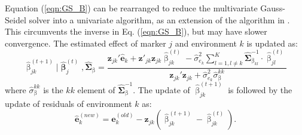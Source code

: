 \documentclass{bmcart}
\begin{document}
Equation (\ref{eqn:GS_B}) can be rearranged to reduce the multivariate Gauss-Seidel solver into a univariate algorithm, as an extension of the algorithm in \cite{GSRU}. This circumvents the inverse in Eq. (\ref{eqn:GS_B}), but may have slower convergence. The estimated effect of marker $j$ and environment $k$ is updated as:
\begin{equation} \nonumber
\hat{\upbeta}^{(t+1)}_{jk}|\hat{\mathbf{\upbeta}}^{(t)}_j,\hat{\mathbf{\Sigma}}_\upbeta = \frac{ \mathbf{z}_{jk}'\hat{\mathbf{e}}_k + \mathbf{z}'_{jk}  \mathbf{z}_{jk} \hat{\upbeta}_{jk}^{(t)} - \hat{\sigma}^{2}_{e_k}\sum^K_{l=1, l\ne k}\hat{\mathbf{\Sigma}}^{-1}_{\upbeta_{kl}}\cdot\hat{\upbeta}^{(t)}_{jl}}{ \mathbf{z}_{jk} ' \mathbf{z}_{jk} + \hat{\sigma}^2_{e_k}\hat{\sigma}_\upbeta^{kk} }
\end{equation}
where $\hat{\sigma}_\upbeta^{kk}$ is the $kk$ element of $\hat{\mathbf{\Sigma}}^{-1}_\upbeta$.
The update of $\hat{\upbeta}^{(t+1)}_{jk}$ is followed by the update of residuals of environment $k$ as:
\begin{equation} \nonumber
\hat{\mathbf{e}}^{(new)}_k = \hat{\mathbf{e}}^{(old)}_k-\mathbf{z}_{jk}(\hat{\upbeta}_{jk}^{(t+1)}-\hat{\upbeta}_{jk}^{(t)}).
\end{equation}
\end{document}
